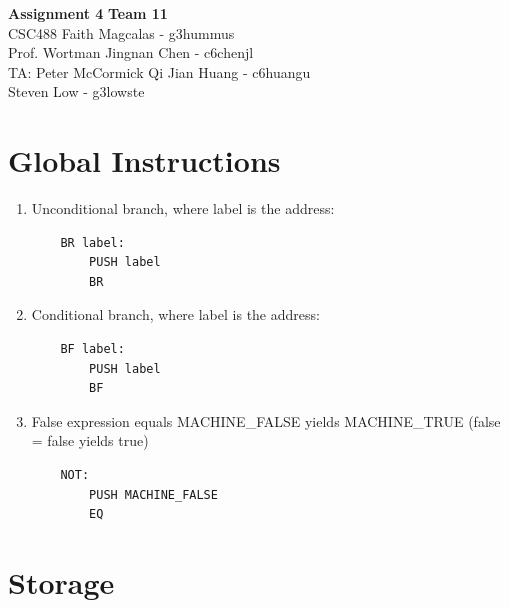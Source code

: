 \documentclass[11pt]{article}
\begin{document}
\noindent
\large\textbf{Assignment 4} \hfill \textbf{Team 11} \\
\normalsize CSC488 \hfill Faith Magcalas - g3hummus \\
Prof. Wortman \hfill Jingnan Chen - c6chenjl \\
TA: Peter McCormick \hfill Qi Jian Huang - c6huangu \\
\hspace*{0pt} \hfill Steven Low - g3lowste

\section*{Global Instructions}
\begin{enumerate}
\item Unconditional branch, where label is the address:
\begin{lstlisting}
    BR label:
        PUSH label
        BR
\end{lstlisting}

\item Conditional branch, where label is the address:
\begin{lstlisting}
    BF label:
        PUSH label
        BF
\end{lstlisting}

\item False expression equals MACHINE\_FALSE yields MACHINE\_TRUE (false = false yields true)
\begin{lstlisting}
    NOT: 
        PUSH MACHINE_FALSE
        EQ
\end{lstlisting}

\end{enumerate}

\section*{Storage}
\end{document}
